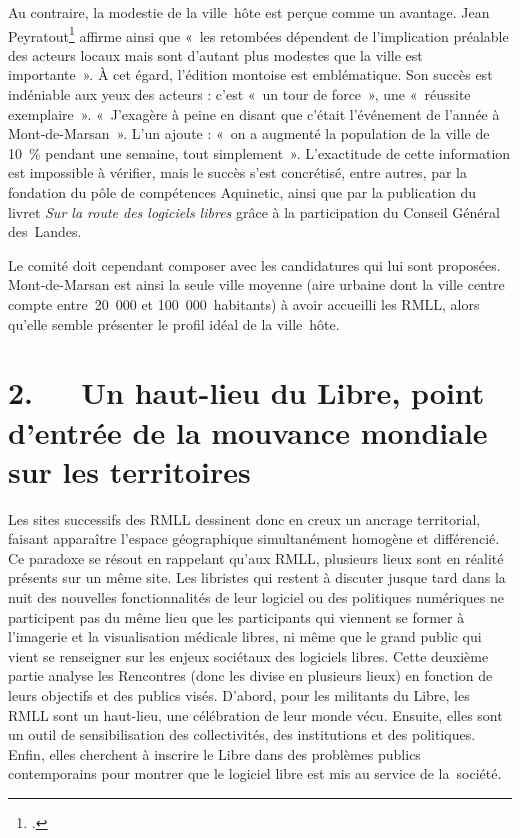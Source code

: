 \documentclass{FramateX}
\begin{document}
\begin{refsection}
Au contraire, la modestie de la ville~hôte est perçue comme un avantage.
Jean
Peyratout\footnote{\cite[p.~25]{jessaumeles2012}.} affirme ainsi que «~les
retombées dépendent de l'implication préalable des acteurs locaux mais
sont d'autant plus modestes que la ville est importante~». À cet
égard, l'édition montoise est emblématique. Son succès est indéniable
aux yeux des acteurs : c'est «~un tour de force~»,
une «~réussite exemplaire~».
«~J'exagère à peine en disant que c'était
l'événement de l'année à Mont-de-Marsan~». L'un ajoute :
«~on a augmenté la population de la ville de 10~\%
pendant une semaine, tout simplement~». L'exactitude de cette
information est impossible à vérifier, mais le succès s'est concrétisé,
entre autres, par la fondation du pôle de compétences Aquinetic, ainsi
que par la publication du livret \textit{Sur la route des logiciels
libres} grâce à la participation du Conseil Général des~Landes.

Le comité doit cependant composer avec les candidatures qui lui sont
proposées. Mont-de-Marsan est ainsi la seule ville moyenne (aire
urbaine dont la ville centre compte entre~20~000 et 100~000~habitants)
à avoir accueilli les RMLL, alors qu'elle semble présenter le profil
idéal de la ville~hôte.

\section*{2.~~~Un haut-lieu du Libre, point d'entrée de la mouvance mondiale sur les territoires}
{}


Les sites successifs des RMLL dessinent donc en creux un ancrage
territorial, faisant apparaître l'espace géographique simultanément
homogène et différencié. Ce paradoxe se résout en rappelant qu'aux
RMLL, plusieurs lieux sont en réalité présents sur un même site. Les
libristes qui restent à discuter jusque tard dans la nuit des nouvelles
fonctionnalités de leur logiciel ou des politiques numériques ne
participent pas du même lieu que les participants qui viennent se
former à l'imagerie et la visualisation médicale libres, ni même que le
grand public qui vient se renseigner sur les enjeux sociétaux des
logiciels libres. Cette deuxième partie analyse les Rencontres (donc
les divise en plusieurs lieux) en fonction de leurs objectifs et des
publics visés. D'abord, pour les militants du Libre, les RMLL sont un
haut-lieu, une célébration de leur monde vécu. Ensuite, elles sont un
outil de sensibilisation des collectivités, des institutions et des
politiques. Enfin, elles cherchent à inscrire le Libre dans des
problèmes publics contemporains pour montrer que le logiciel libre est
mis au service de la~société.


\end{refsection}
\end{document}
